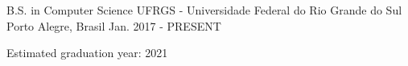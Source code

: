 \begin{cventries}
  \cventry
    {B.S. in Computer Science}
    {UFRGS - Universidade Federal do Rio Grande do Sul}
    {Porto Alegre, Brasil}
    {Jan. 2017 - PRESENT}
    {
      \begin{cvitems}
        \item {Estimated graduation year: 2021}
      \end{cvitems}
    }
\end{cventries}


